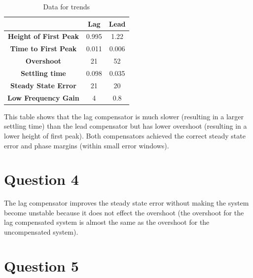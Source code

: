 \documentclass{article}
\begin{document}
\begin{table}[!htbp]
\centering
    \begin{tabular}{|c|c|c|}
        \hline
        &  Lag & Lead \\
        \hline
        \textbf{Height of First Peak} & 0.995 & 1.22\\
        \hline
        \textbf{Time to First Peak} & 0.011 & 0.006\\
        \hline
        \textbf{Overshoot} & 21 & 52\\
        \hline
        \textbf{Settling time} & 0.098 & 0.035\\
        \hline
        \textbf{Steady State Error} & 21 & 20\\
        \hline
        \textbf{Low Frequency Gain} & 4 & 0.8\\
        \hline
    \end{tabular}
    \caption{Data for trends}
\end{table}

This table shows that the lag compensator is much slower (resulting in a larger settling time) than the lead compensator but has lower overshoot (resulting in a lower height of first peak). Both compensators achieved the correct steady state error and phase margins (within small error windows).


\section{Question 4} %
\label{sec:question_4}
The lag compensator improves the steady state error without making the system become unstable because it does not effect the overshoot (the overshoot for the lag compensated system is almost the same as the overshoot for the uncompensated system).

\section{Question 5} %
\label{sec:question_5}
\end{document}

